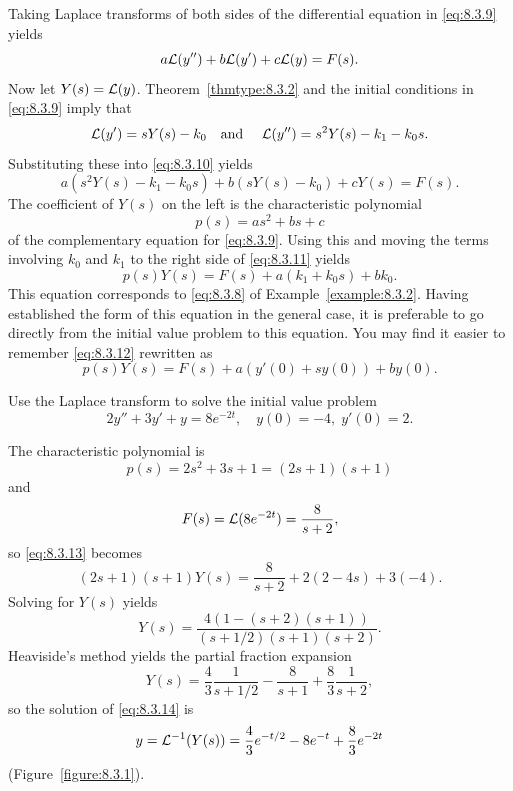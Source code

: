 Taking Laplace transforms of both sides of the differential equation in \eqref{eq:8.3.9} yields
\begin{equation}
  \label{eq:8.3.10}a{\cal L}(y'')+b{\cal L}(y')+c{\cal L}(y)=F(s).
\end{equation}
Now let $Y(s)={\cal L}(y)$. Theorem~\ref{thmtype:8.3.2} and the initial conditions in
\eqref{eq:8.3.9} imply that
\[
  {\cal L}(y')=sY(s)-k_{0}\mbox{\quad and \quad}{\cal L}(y'')=s^{2}Y(s)-k_{1}-k_{0}s.
\]
Substituting these into \eqref{eq:8.3.10} yields
\begin{equation}
  \label{eq:8.3.11}a\left(s^{2}Y(s)-k_{1}-k_{0}s\right)+b\left(sY(s)-k_{0}\right)+cY(s)=F(s).
\end{equation}
The coefficient of $Y(s)$ on the left is the characteristic polynomial
\[
  p(s)=as^{2}+bs+c
\]
of the complementary equation for \eqref{eq:8.3.9}. Using this and moving the terms involving
$k_{0}$ and $k_{1}$ to the right side of \eqref{eq:8.3.11} yields
\begin{equation}
  \label{eq:8.3.12}p(s)Y(s)=F(s)+a(k_{1}+k_{0}s)+bk_{0}.
\end{equation}
This equation corresponds to \eqref{eq:8.3.8} of Example~\ref{example:8.3.2}. Having established the
form of this equation in the general case, it is preferable to go directly from the initial value
problem to this equation. You may find it easier to remember \eqref{eq:8.3.12} rewritten as
\begin{equation}
  \label{eq:8.3.13}p(s)Y(s)=F(s)+a\left(y'(0)+sy(0)\right)+by(0).
\end{equation}

\begin{example}
  \label{example:8.3.3}\rm Use the Laplace transform to solve the initial value problem
  \begin{equation}
    \label{eq:8.3.14}2y''+3y'+y=8e^{-2t},\quad y(0)=-4,\;y'(0)=2.
  \end{equation}
\end{example}
\begin{examplesolution}
\solution The characteristic polynomial is
\[
  p(s)=2s^{2}+3s+1=(2s+1)(s+1)
\]
and
\[
  F(s)={\cal L}(8e^{-2t})=\frac{8}{s+2},
\]
so \eqref{eq:8.3.13} becomes
\[
  (2s+1)(s+1)Y(s)=\frac{8}{s+2}+2(2-4s)+3(-4).
\]
Solving for $Y(s)$ yields
\[
  Y(s)=\frac{4\left(1-(s+2)(s+1)\right)}{(s+1/2)(s+1)(s+2)}.
\]
Heaviside's method yields the partial fraction expansion
\[
  Y(s)=\frac{4}{3}\frac{1}{s+1/2}-\frac{8}{s+1}+\frac{8}{3}\frac{1}{s+2},
\]
so the solution of \eqref{eq:8.3.14} is
\[
  y={\cal L}^{-1}(Y(s))=\frac{4}{3}e^{-t/2}-8e^{-t}+\frac{8}{3}e^{-2t}
\]
(Figure~\ref{figure:8.3.1}).
\end{examplesolution}

